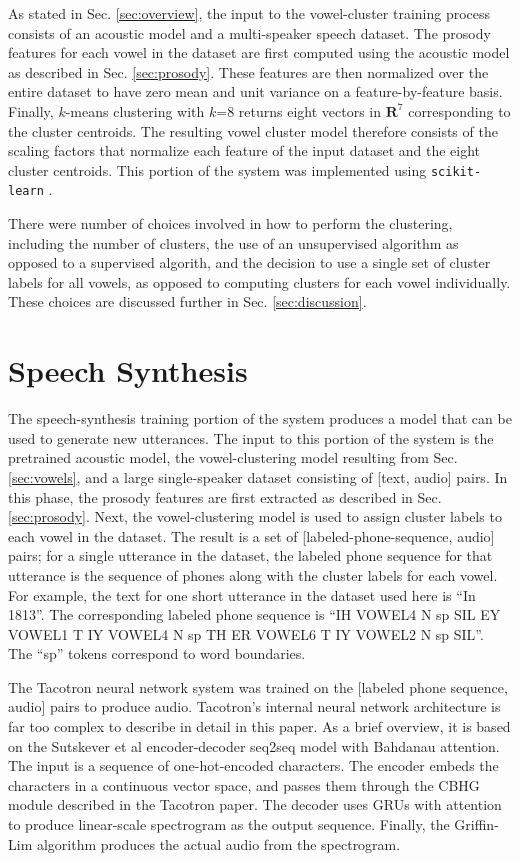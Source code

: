 \documentclass{article}
\begin{document}
As stated in Sec. \ref{sec:overview}, the input to the vowel-cluster training process consists of an acoustic model and a multi-speaker speech dataset.
The prosody features for each vowel in the dataset are first computed using the acoustic model as described in Sec. \ref{sec:prosody}.
These features are then normalized over the entire dataset to have zero mean and unit variance on a feature-by-feature basis.
Finally, $k$-means clustering with $k$=8 returns eight vectors in $\mathbf{R}^7$ corresponding to the cluster centroids.
The resulting vowel cluster model therefore consists of the scaling factors that normalize each feature of the input dataset and the eight cluster centroids. This portion of the system was implemented using \texttt{scikit-learn} \cite{scikit-learn}.

There were number of choices involved in how to perform the clustering, including the number of clusters, the use of an unsupervised algorithm as opposed to a supervised algorith, and the decision to use a single set of cluster labels for all vowels, as opposed to computing clusters for each vowel individually. These choices are discussed further in Sec. \ref{sec:discussion}.


\section{Speech Synthesis}
\label{sec:tacotron}

The speech-synthesis training portion of the system produces a model that can be used to generate new utterances. The input to this portion of the system is the pretrained acoustic model, the vowel-clustering model resulting from Sec. \ref{sec:vowels}, and a large single-speaker dataset consisting of [text, audio] pairs.
In this phase, the prosody features are first extracted as described in Sec. \ref{sec:prosody}. Next, the vowel-clustering model is used to assign cluster labels to each vowel in the dataset.
The result is a set of [labeled-phone-sequence, audio] pairs; for a single utterance in the dataset, the labeled phone sequence for that utterance is the sequence of phones along with the cluster labels for each vowel. For example, the text for one short utterance in the dataset used here is ``In 1813''.
The corresponding labeled phone sequence is ``IH VOWEL4 N sp SIL EY VOWEL1 T IY VOWEL4 N sp TH ER VOWEL6 T IY VOWEL2 N sp SIL''. The ``sp'' tokens correspond to word boundaries.

The Tacotron \cite{wang2017tacotron} neural network system was trained on the [labeled phone sequence, audio] pairs to produce audio.
Tacotron's internal neural network architecture is far too complex to describe in detail in this paper. As a brief overview, it is based on the Sutskever et al \cite{sutskever2014sequence} encoder-decoder seq2seq model with Bahdanau \cite{bahdanau2014neural} attention. The input is a sequence of one-hot-encoded characters.
The encoder embeds the characters in a continuous vector space, and passes them through the CBHG module described in the Tacotron paper.
The decoder uses GRUs with attention to produce linear-scale spectrogram as the output sequence. Finally, the Griffin-Lim algorithm produces the actual audio from the spectrogram.
\end{document}
